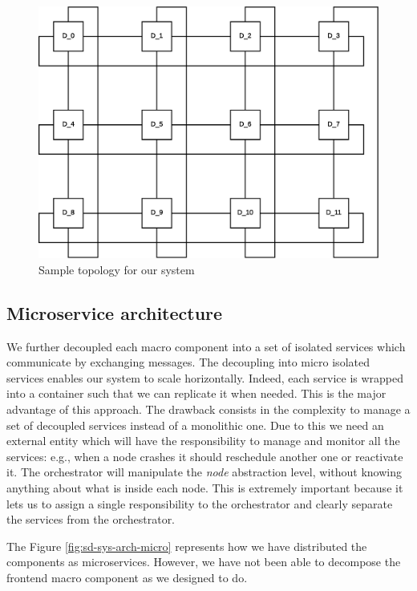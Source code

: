 \begin{figure}[H]
  \centering
  \includegraphics[scale=0.5,keepaspectratio]
    {images/solution/topology.eps}
  \caption{Sample topology for our system}
  \label{fig:sd-sys-arch-topology}
\end{figure}


\subsection{Microservice architecture}

We further decoupled each macro component into a set of isolated services
which communicate by exchanging messages. The decoupling into micro isolated
services enables our system to scale horizontally. Indeed, each service is wrapped
into a container such that we can replicate it when needed. This is the major advantage
of this approach. The drawback consists in the complexity to manage a set of decoupled
services instead of a monolithic one. Due to this we need an external entity which
will have the responsibility to manage and monitor all the services: e.g., when a node crashes it should reschedule another one or reactivate it. The orchestrator will
manipulate the \textit{node} abstraction level, without knowing anything about what is inside each node. This is extremely important because it lets us to assign
a single responsibility to the orchestrator and clearly separate the services from
the orchestrator.


The Figure \ref{fig:sd-sys-arch-micro} represents how we have distributed
the components as microservices. However, we have not been able to decompose the
frontend macro component as we designed to do.

